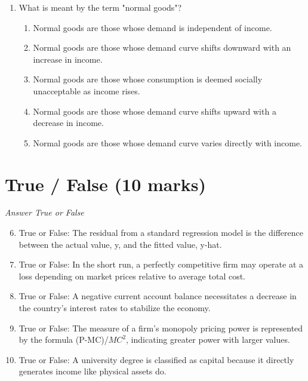 \documentclass[12pt]{article}
\begin{document}
\begin{enumerate}[label=\arabic*.]
\begin{enumerate}[label=(\alph*)]
    \item 50
    \item 5
    \item 10
    \item 90
    \item 15
\end{enumerate}
\item What is meant by the term "normal goods"?
\begin{enumerate}[label=(\alph*)]
    \item Normal goods are those whose demand is independent of income.
    \item Normal goods are those whose demand curve shifts downward with an increase in income.
    \item Normal goods are those whose consumption is deemed socially unacceptable as income rises.
    \item Normal goods are those whose demand curve shifts upward with a decrease in income.
    \item Normal goods are those whose demand curve varies directly with income.
\end{enumerate}
\end{enumerate}

\section*{True / False (10 marks)}
\textit{Answer True or False}
\begin{enumerate}[label=\arabic*.]
\setcounter{enumi}{5}
\item True or False: The residual from a standard regression model is the difference between the actual value, y, and the fitted value, y-hat.
\item True or False: In the short run, a perfectly competitive firm may operate at a loss depending on market prices relative to average total cost.
\item True or False: A negative current account balance necessitates a decrease in the country's interest rates to stabilize the economy.
\item True or False: The measure of a firm's monopoly pricing power is represented by the formula (P-MC)/$MC^2$, indicating greater power with larger values.
\item True or False: A university degree is classified as capital because it directly generates income like physical assets do.
\end{enumerate}
\end{document}
